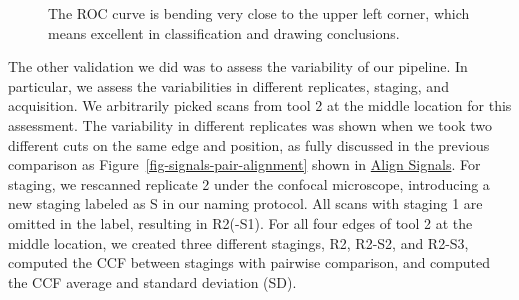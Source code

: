 \documentclass[fleqn,10pt]{wlscirep}
\begin{document}
\begin{figure}


\caption{\label{fig-ccf-ROC}The ROC curve is bending very close to the
upper left corner, which means excellent in classification and drawing
conclusions.}

\end{figure}%

The other validation we did was to assess the variability of our
pipeline. In particular, we assess the variabilities in different
replicates, staging, and acquisition. We arbitrarily picked scans from
tool 2 at the middle location for this assessment. The variability in
different replicates was shown when we took two different cuts on the
same edge and position, as fully discussed in the previous comparison as
Figure~\ref{fig-signals-pair-alignment} shown in
\hyperref[sec-align-signals]{Align Signals}. For staging, we rescanned
replicate 2 under the confocal microscope, introducing a new staging
labeled as S in our naming protocol. All scans with staging 1 are
omitted in the label, resulting in R2(-S1). For all four edges of tool 2
at the middle location, we created three different stagings, R2, R2-S2,
and R2-S3, computed the CCF between stagings with pairwise comparison,
and computed the CCF average and standard deviation (SD).
\end{document}
